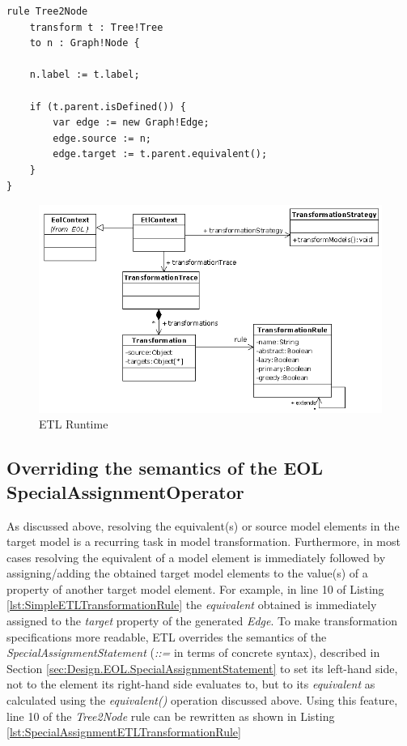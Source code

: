 \begin{lstlisting}[basicstyle=\ttfamily\footnotesize, flexiblecolumns=true, numbers=none, nolol=true, caption=Exemplar ETL Rule demonstrating the \emph{equivalent()} operation, label=lst:SimpleETLTransformationRule, numbers=left, language=ETL, tabsize=2]
rule Tree2Node
	transform t : Tree!Tree
	to n : Graph!Node { 
	
	n.label := t.label;
	
	if (t.parent.isDefined()) {
		var edge := new Graph!Edge;
		edge.source := n;
		edge.target := t.parent.equivalent();
	}
}
\end{lstlisting}

\begin{landscape}
\begin{figure}
	\centering
		\includegraphics{images/EtlRuntime.png}
	\caption{ETL Runtime}
	\label{fig:EtlRuntime}
\end{figure}
\end{landscape}

\subsection{Overriding the semantics of the EOL SpecialAssignmentOperator}
\label{sec:Design.ETL.SpecialAssignmentOperator}

As discussed above, resolving the equivalent(s) or source model elements in the target model is a recurring task in model transformation. Furthermore, in most cases resolving the equivalent of a model element is immediately followed by assigning/adding the obtained target model elements to the value(s) of a property of another target model element. For example, in line 10 of Listing \ref{lst:SimpleETLTransformationRule} the \emph{equivalent} obtained is immediately assigned to the \emph{target} property of the generated \emph{Edge}. To make transformation specifications more readable, ETL overrides the semantics of the \emph{SpecialAssignmentStatement} (\emph{::=} in terms of concrete syntax), described in Section \ref{sec:Design.EOL.SpecialAssignmentStatement} to set its left-hand side, not to the element its right-hand side evaluates to, but to its \emph{equivalent} as calculated using the \emph{equivalent()} operation discussed above. Using this feature, line 10 of the \emph{Tree2Node} rule can be rewritten as shown in Listing \ref{lst:SpecialAssignmentETLTransformationRule}

